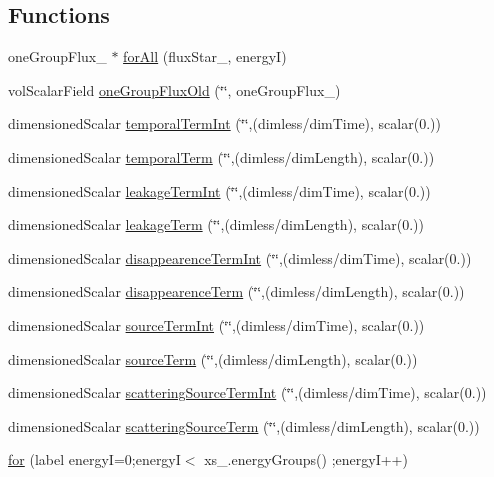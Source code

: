 \subsection*{Functions}
\begin{DoxyCompactItemize}
\item 
one\+Group\+Flux\+\_\+ $\ast$ \hyperlink{integralPredictorSP3_8H_afe8323c0774ef442e2e4c019cce98890}{for\+All} (flux\+Star\+\_\+, energyI)
\item 
vol\+Scalar\+Field \hyperlink{integralPredictorSP3_8H_a34c5d9843ad8c67cedc393b8b7e6d3a0}{one\+Group\+Flux\+Old} (\char`\"{}\char`\"{}, one\+Group\+Flux\+\_\+)
\item 
dimensioned\+Scalar \hyperlink{integralPredictorSP3_8H_a6a6bc2b4b802b67f7144e4fd168ce1b5}{temporal\+Term\+Int} (\char`\"{}\char`\"{},(dimless/dim\+Time), scalar(0.))
\item 
dimensioned\+Scalar \hyperlink{integralPredictorSP3_8H_aa467be9189f64fd789d4f0e5350f774d}{temporal\+Term} (\char`\"{}\char`\"{},(dimless/dim\+Length), scalar(0.))
\item 
dimensioned\+Scalar \hyperlink{integralPredictorSP3_8H_a1edc21b2e8fa9d1796ee10236abc2889}{leakage\+Term\+Int} (\char`\"{}\char`\"{},(dimless/dim\+Time), scalar(0.))
\item 
dimensioned\+Scalar \hyperlink{integralPredictorSP3_8H_a14716655bc7cabcaa62145cd5403f125}{leakage\+Term} (\char`\"{}\char`\"{},(dimless/dim\+Length), scalar(0.))
\item 
dimensioned\+Scalar \hyperlink{integralPredictorSP3_8H_af3f24745c62331a2c7c7bd0dead37b6a}{disappearence\+Term\+Int} (\char`\"{}\char`\"{},(dimless/dim\+Time), scalar(0.))
\item 
dimensioned\+Scalar \hyperlink{integralPredictorSP3_8H_ab21a35b9626b02d7f55c804a04c79456}{disappearence\+Term} (\char`\"{}\char`\"{},(dimless/dim\+Length), scalar(0.))
\item 
dimensioned\+Scalar \hyperlink{integralPredictorSP3_8H_ac69cf9b0ca49bbc73bbd8757cc3ebae3}{source\+Term\+Int} (\char`\"{}\char`\"{},(dimless/dim\+Time), scalar(0.))
\item 
dimensioned\+Scalar \hyperlink{integralPredictorSP3_8H_a9f27d4283866b0f185dc27a817c5da2e}{source\+Term} (\char`\"{}\char`\"{},(dimless/dim\+Length), scalar(0.))
\item 
dimensioned\+Scalar \hyperlink{integralPredictorSP3_8H_a6c06ef7a771d3996b52235080e43589b}{scattering\+Source\+Term\+Int} (\char`\"{}\char`\"{},(dimless/dim\+Time), scalar(0.))
\item 
dimensioned\+Scalar \hyperlink{integralPredictorSP3_8H_a054d85a1188784dbd918217cb90dd901}{scattering\+Source\+Term} (\char`\"{}\char`\"{},(dimless/dim\+Length), scalar(0.))
\item 
\hyperlink{integralPredictorSP3_8H_a9e2f51bb368ba752c8b024e174e2908b}{for} (label energyI=0;energyI$<$ xs\+\_\+.\+energy\+Groups() ;energyI++)
\end{DoxyCompactItemize}
